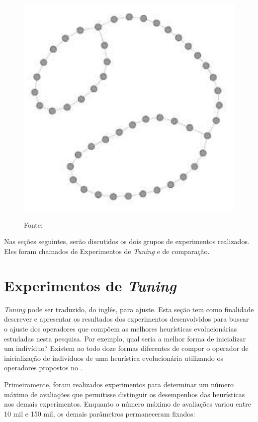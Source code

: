 \begin{figure}[tp]
\begin{minipage}{0.5\textwidth}
		\includegraphics[width=\linewidth]{images/mapa_cicles_corridor.png}
		\label{fig:cicles_corridor}
	\end{minipage}
	\caption*{Fonte: \citep{sampaiophd}}
	\label{fig:mapas}
\end{figure}

Nas seções seguintes, serão discutidos os dois grupos de experimentos 
realizados. Eles foram chamados de Experimentos de \textit{Tuning} e de 
comparação.

\section{Experimentos de \textit{Tuning}}

\textit{Tuning} pode ser traduzido, do inglês, para ajuste. Esta seção tem como 
finalidade descrever e apresentar os resultados dos experimentos desenvolvidos 
para buscar o ajuste dos operadores que compõem as melhores heurísticas 
evolucionárias estudadas nesta pesquisa. Por exemplo, qual seria a melhor forma 
de inicializar um indivíduo? Existem ao todo doze formas diferentes de compor 
o operador de inicialização de indivíduos de uma heurística evolucionária 
utilizando os operadores propostos no .

Primeiramente, foram realizados experimentos para determinar um número máximo 
de avaliações que permitisse distinguir os desempenhos das heurísticas nos 
demais experimentos. Enquanto o número máximo de avaliações variou entre 10 mil 
e 150 mil, os demais parâmetros permaneceram fixados:

